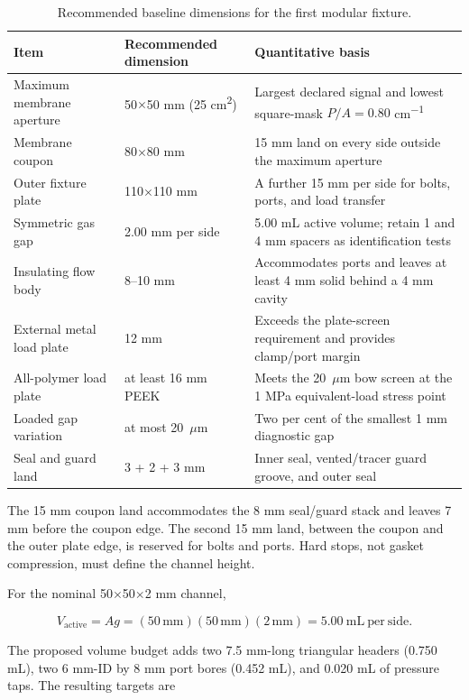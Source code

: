 \documentclass[10pt,a4paper]{article}
\begin{document}
\begin{table}[H]
\centering
\caption{Recommended baseline dimensions for the first modular fixture.}
\begin{tabularx}{\textwidth}{@{}Yp{37mm}Y@{}}
\toprule
\textbf{Item} & \textbf{Recommended dimension} & \textbf{Quantitative basis} \\
\midrule
Maximum membrane aperture & 50$\times$50 mm (25 cm\textsuperscript{2}) & Largest declared signal and lowest square-mask $P/A=0.80$ cm\textsuperscript{$-1$} \\
Membrane coupon & 80$\times$80 mm & 15 mm land on every side outside the maximum aperture \\
Outer fixture plate & 110$\times$110 mm & A further 15 mm per side for bolts, ports, and load transfer \\
Symmetric gas gap & 2.00 mm per side & 5.00 mL active volume; retain 1 and 4 mm spacers as identification tests \\
Insulating flow body & 8--10 mm & Accommodates ports and leaves at least 4 mm solid behind a 4 mm cavity \\
External metal load plate & 12 mm & Exceeds the plate-screen requirement and provides clamp/port margin \\
All-polymer load plate & at least 16 mm PEEK & Meets the 20~$\mu$m bow screen at the 1 MPa equivalent-load stress point \\
Loaded gap variation & at most 20~$\mu$m & Two per cent of the smallest 1 mm diagnostic gap \\
Seal and guard land & 3 + 2 + 3 mm & Inner seal, vented/tracer guard groove, and outer seal \\
\bottomrule
\end{tabularx}
\end{table}

The 15 mm coupon land accommodates the 8 mm seal/guard stack and leaves 7 mm
before the coupon edge. The second 15 mm land, between the coupon and the outer
plate edge, is reserved for bolts and ports. Hard stops, not gasket compression,
must define the channel height.

For the nominal 50$\times$50$\times$2 mm channel,

\begin{equation}
V_{\mathrm{active}}=Ag
=(50\,\mathrm{mm})(50\,\mathrm{mm})(2\,\mathrm{mm})
=5.00\ \mathrm{mL\ per\ side}.
\end{equation}

The proposed volume budget adds two 7.5 mm-long triangular headers
(0.750 mL), two 6 mm-ID by 8 mm port bores (0.452 mL), and 0.020 mL of
pressure taps. The resulting targets are
\end{document}
